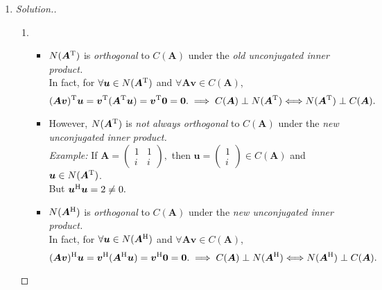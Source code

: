 \begin{enumerate}
\begin{proof}[Solution.]
\begin{enumerate}
\[\]
Since every term for the series $e^{\Lambda}$ is \textit{diagonal matrix}, the series $e^{\Lambda}$ is consequently a \textit{diagonal matrix}.\\
Hence $e^{\bm A}$ is diagonalizable.
\item
True.\\
\emph{Reason: }
Since $\bm A\bm A^{-1}=\bm I$, taking complex conjugate we obtain $\overline{\bm A\bm A^{-1}}=\bm I$. Taking transpose we get $(\bm A^{-1})\Her\bm A\Her=\bm I.$\\
And we have $\bm A\Her=\bm A$, so $(\bm A^{-1})\Her\bm A=\bm I.$ That is to say $(\bm A^{-1})\Her=\bm A^{-1}.$ Hence $\bm A^{-1}$ is Hermitian.
\end{enumerate}
\end{proof}
\item
\begin{proof}[Solution.]
\begin{enumerate}
\item
\begin{itemize}
\item
$N(\bm A^{\mathrm T})$ is \textit{orthogonal} to $C(\bm A)$ under the \emph{old unconjugated inner product.}\\
In fact, for $\forall\bm u\in N(\bm A^{\mathrm T})$ and $\forall\bm{Av}\in C(\bm A)$,
\[
(\bm{Av})^{\mathrm T}\bm u=\bm v^{\mathrm T}(\bm A^{\mathrm T}\bm u)=\bm v^{\mathrm T}\bm 0=\bm 0.
\implies
C(\bm A)\perp N(\bm A^{\mathrm T})\Longleftrightarrow
N(\bm A^{\mathrm T})\perp C(\bm A).
\]
\item
However, $N(\bm A^{\mathrm T})$ is \textit{not always orthogonal} to $C(\bm A)$ under the \emph{new unconjugated inner product.}\\
\emph{Example: }If $\bm A=\begin{pmatrix}
1&1\\i&i
\end{pmatrix},$ then $\bm u=\begin{pmatrix}
1\\i
\end{pmatrix}\in C(\bm A)$ and $\bm u\in N(\bm A^{\mathrm T})$.\\ But $\bm u^{\mathrm H}\bm u=2\ne0.$
\item
$N(\bm A^{\mathrm H})$ is \textit{orthogonal} to $C(\bm A)$ under the \emph{new unconjugated inner product.}\\
In fact, for $\forall\bm u\in N(\bm A^{\mathrm H})$ and $\forall\bm{Av}\in C(\bm A)$,
\[
(\bm{Av})^{\mathrm H}\bm u=\bm v^{\mathrm H}(\bm A^{\mathrm H}\bm u)=\bm v^{\mathrm H}\bm 0=\bm 0.
\implies
C(\bm A)\perp N(\bm A^{\mathrm H})\Longleftrightarrow
N(\bm A^{\mathrm H})\perp C(\bm A).
\]
\end{itemize}
\end{enumerate}
\end{proof}
\end{enumerate}

